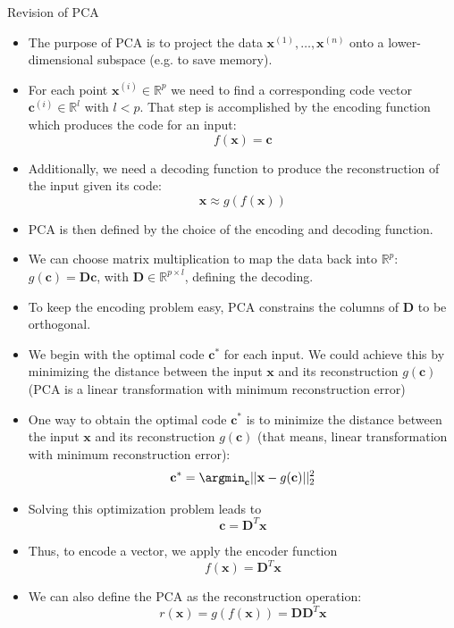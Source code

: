 \begin{vbframe}{Revision of PCA}
\begin{itemize}
  \item The purpose of PCA is to project the data $\mathbf{x}^{(1)}, \dots, \mathbf{x}^{(n)}$ onto a lower-dimensional subspace (e.g. to save memory). \\
  \item For each point $\mathbf{x}^{(i)} \in \mathbb{R}^p$ we need to find a corresponding code vector $\mathbf{c}^{(i)} \in \mathbb{R}^l$ with $l < p$. That step is accomplished by the encoding function which produces the code for an input: $$f(\mathbf{x}) = \mathbf{c}$$
  \item  Additionally, we need a decoding function to produce the reconstruction of the input given its code: $$\mathbf{x} \approx g(f(\mathbf{x}))$$
  \item PCA is then defined by the choice of the encoding and decoding function.
  \item We can choose matrix multiplication to map the data back into $\mathbb{R}^{p}$: $g(\mathbf{c}) = \mathbf{Dc}$, with $\mathbf{D} \in \mathbb{R}^{p \times l}$, defining the decoding.
\framebreak
  \item To keep the encoding problem easy, PCA constrains the columns of $\mathbf{D}$ to be orthogonal.
  \item We begin with the optimal code $\mathbf{c}^{*}$ for each input. We could achieve this by minimizing the distance between the input $\mathbf{x}$ and its reconstruction $g(\mathbf{c})$ (PCA is a linear transformation with minimum reconstruction error)
  \item One way to obtain the optimal code $\mathbf{c}^{*}$ is to minimize the distance between the input $\mathbf{x}$ and its reconstruction $g(\mathbf{c})$ (that means, linear transformation with minimum reconstruction error):
   $$\mathbf{c}^{*} = \displaystyle\argmin_{\mathbf{c}} ||\mathbf{x} - g(\mathbf{c})||^2_2$$
  \item Solving this optimization problem leads to
  $$\mathbf{c} = \mathbf{D}^T\mathbf{x}$$
  \item Thus, to encode a vector, we apply the encoder function
  $$f(\mathbf{x}) = \mathbf{D}^T \mathbf{x}$$
  \item
  We can also define the PCA as the reconstruction operation:
  $$r(\mathbf{x}) = g(f(\mathbf{x})) = \mathbf{DD}^T \mathbf{x}$$

\end{itemize}
\end{vbframe}
